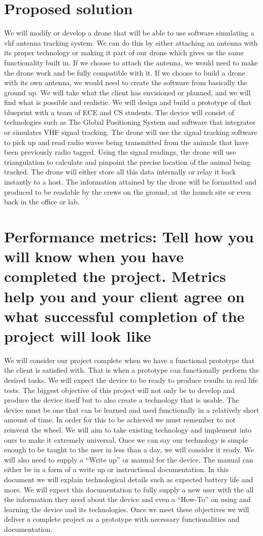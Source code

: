 \documentclass[10pt, draftclsnofoot,onecolumn, letterpaper]{IEEEtran}
\begin{document}
\section{Proposed solution}

We will modify or develop a drone that will be able to use software simulating a vhf antenna tracking system. We can do this by either attaching an antenna with its proper technology or making it part of our drone which gives us the same functionality built in. If we choose to attach the antenna, we would need to make the drone work and be fully compatible with it. If we choose to build a drone with its own antenna, we would need to create the software from basically the ground up. We will take what the client has envisioned or planned, and we will find what is possible and realistic. We will design and build a prototype of that blueprint with a team of ECE and CS students. The device will consist of technologies such as The Global Positioning System and software that integrates or simulates VHF signal tracking. The drone will use the signal tracking software to pick up and read radio waves being transmitted from the animals that have been previously radio tagged. Using the signal readings, the drone will use triangulation to calculate and pinpoint the precise location of the animal being tracked. The drone will either store all this data internally or relay it back instantly to a host. The information attained by the drone will be formatted and produced to be readable by the crews on the ground, at the launch site or even back in the office or lab.

\section{Performance metrics: Tell how you will know when you have completed the project. Metrics help you and your client agree on what successful completion of the project will look like}

We will consider our project complete when we have a functional prototype that the client is satisfied with. That is when a prototype can functionally perform the desired tasks. We will expect the device to be ready to produce results in real life tests. The biggest objective of this project will not only be to develop and produce the device itself but to also create a technology that is usable. The device must be one that can be learned and used functionally in a relatively short amount of time. In order for this to be achieved we must remember to not reinvent the wheel. We will aim to take existing technology and implement into ours to make it extremely universal. Once we can say our technology is simple enough to be taught to the user in less than a day, we will consider it ready. We will also need to supply a “Write up” or manual for the device. The manual can either be in a form of a write up or instructional documentation. In this document we will explain technological details such as expected battery life and more. We will expect this documentation to fully supply a new user with the all the information they need about the device and even a “How-To” on using and learning the device and its technologies. Once we meet these objectives we will deliver a complete project as a prototype with necessary functionalities and documentation.
\end{document}
